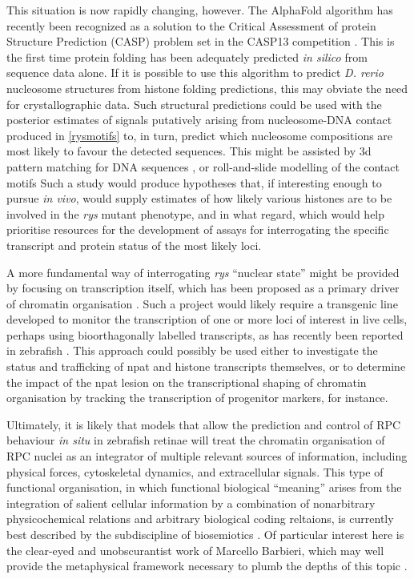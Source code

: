 This situation is now rapidly changing, however. The AlphaFold algorithm has recently been recognized as a solution to the Critical Assessment of protein Structure Prediction (CASP) problem set in the CASP13 competition \cite{AlQuraishi2019}. This is the first time protein folding has been adequately predicted \textit{in silico} from sequence data alone. If it is possible to use this algorithm to predict \textit{D. rerio} nucleosome structures from histone folding predictions, this may obviate the need for crystallographic data. Such structural predictions could be used with the posterior estimates of signals putatively arising from nucleosome-DNA contact produced in \autoref{rysmotifs} to, in turn, predict which nucleosome compositions are most likely to favour the detected sequences. This might be assisted by 3d pattern matching for DNA sequences \cite{Herisson2007}, or roll-and-slide modelling of the contact motifs \cite{Tolstorukov2007} Such a study would produce hypotheses that, if interesting enough to pursue \textit{in vivo}, would supply estimates of how likely various histones are to be involved in the \textit{rys} mutant phenotype, and in what regard, which would help prioritise resources for the development of assays for interrogating the specific transcript and protein status of the most likely loci.

A more fundamental way of interrogating \textit{rys} ``nuclear state'' might be provided by focusing on transcription itself, which has been proposed as a primary driver of chromatin organisation \cite{Cook2018}. Such a project would likely require a transgenic line developed to monitor the transcription of one or more loci of interest in live cells, perhaps using bioorthagonally labelled transcripts, as has recently been reported in zebrafish \cite{Westerich2020}. This approach could possibly be used either to investigate the status and trafficking of npat and histone transcripts themselves, or to determine the impact of the npat lesion on the transcriptional shaping of chromatin organisation by tracking the transcription of progenitor markers, for instance.

Ultimately, it is likely that models that allow the prediction and control of RPC behaviour \textit{in situ} in zebrafish retinae will treat the chromatin organisation of RPC nuclei as an integrator of multiple relevant sources of information, including physical forces, cytoskeletal dynamics, and extracellular signals. This type of functional organisation, in which functional biological ``meaning'' arises from the integration of salient cellular information by a combination of nonarbitrary physicochemical relations and arbitrary biological coding reltaions, is currently best described by the subdiscipline of biosemiotics \cite{Hoffmeyer2008,Favareau2015,Hoffmeyer2015}. Of particular interest here is the clear-eyed and unobscurantist work of Marcello Barbieri, which may well provide the metaphysical framework necessary to plumb the depths of this topic \cite{Barbieri2015}.